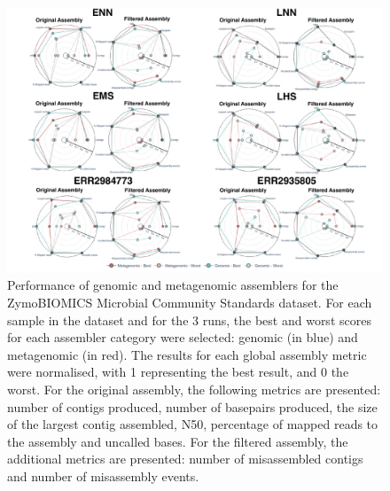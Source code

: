 \begin{figure}[h!]
\centering
\includegraphics[width=\textwidth]{figures/chapter 5/Figure 5.pdf}
\caption{Performance of genomic and metagenomic assemblers for the ZymoBIOMICS Microbial Community Standards dataset. For each sample in the dataset and for the 3 runs, the best and worst scores for each assembler category were selected: genomic (in blue) and metagenomic (in red). The results for each global assembly metric were normalised, with 1 representing the best result, and 0 the worst. For the original assembly, the following metrics are presented: number of contigs produced, number of basepairs produced, the size of the largest contig assembled, N50, percentage of mapped reads to the assembly and uncalled bases.  For the filtered assembly, the additional metrics are presented: number of misassembled contigs and number of misassembly events.}
\label{fig:chap5_figure5}
\end{figure}

